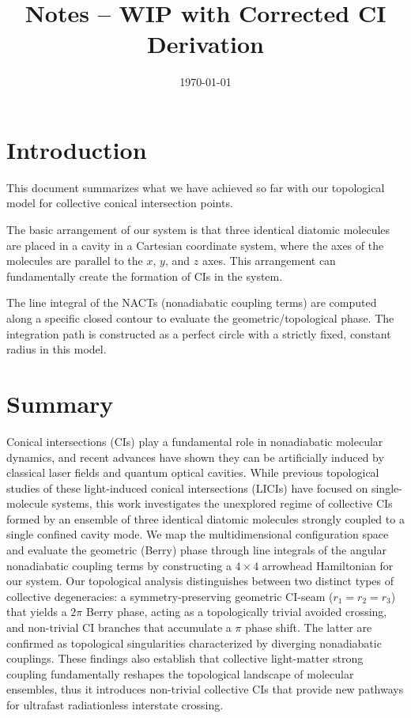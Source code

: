 \documentclass{article}
\title{Notes -- WIP with Corrected CI Derivation}
\date{\today}
\begin{document}
\maketitle

\section{Introduction}

This document summarizes what we have achieved so far with our topological model for collective conical intersection points.


The basic arrangement of our system is that three identical diatomic molecules are placed in a cavity in a Cartesian coordinate system, where the axes of the molecules are parallel to the $x$, $y$, and $z$ axes. This arrangement can fundamentally create the formation of CIs in the system.


The line integral of the NACTs (nonadiabatic coupling terms) are computed along a specific closed contour to evaluate the geometric/topological phase. The integration path is constructed as a perfect circle with a strictly fixed, constant radius in this model.

\section{Summary}

Conical intersections (CIs) play a fundamental role in nonadiabatic molecular dynamics, and recent advances have shown they can be artificially induced by classical laser fields and quantum optical cavities. While previous topological studies of these light-induced conical intersections (LICIs) have focused on single-molecule systems, this work investigates the unexplored regime of collective CIs formed by an ensemble of three identical diatomic molecules strongly coupled to a single confined cavity mode. We map the multidimensional configuration space and evaluate the geometric (Berry) phase through line integrals of the angular nonadiabatic coupling terms by constructing a $4 \times 4$ arrowhead Hamiltonian for our system. Our topological analysis distinguishes between two distinct types of collective degeneracies: a symmetry-preserving geometric CI-seam ($r_1 = r_2 = r_3$) that yields a $2\pi$ Berry phase, acting as a topologically trivial avoided crossing, and non-trivial CI branches that accumulate a $\pi$ phase shift. The latter are confirmed as topological singularities characterized by diverging nonadiabatic couplings. These findings also establish that collective light-matter strong coupling fundamentally reshapes the topological landscape of molecular ensembles, thus it introduces non-trivial collective CIs that provide new pathways for ultrafast radiationless interstate crossing.
\end{document}
